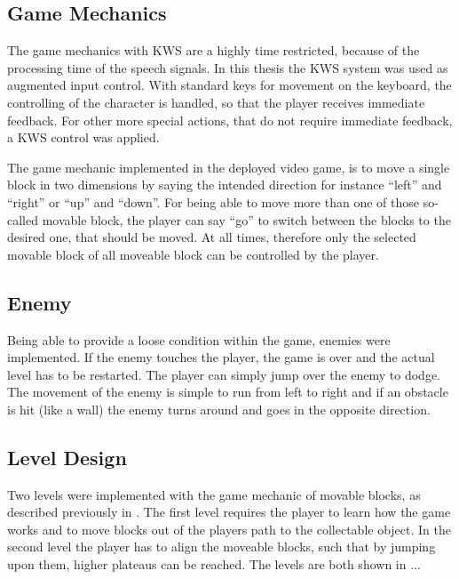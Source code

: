 
\subsection{Game Mechanics}\label{game_design_mechanics}
The game mechanics with KWS are a highly time restricted, because of the processing time of the speech signals.
In this thesis the KWS system was used as augmented input control.
With standard keys for movement on the keyboard, the controlling of the character is handled, so that the player receives immediate feedback. 
For other more special actions, that do not require immediate feedback, a KWS control was applied.

The game mechanic implemented in the deployed video game, is to move a single block in two dimensions by saying the intended direction for instance \enquote{left} and \enquote{right} or \enquote{up} and \enquote{down}.
For being able to move more than one of those so-called movable block, the player can say \enquote{go} to switch between the blocks to the desired one, that should be moved.
At all times, therefore only the selected movable block of all moveable block can be controlled by the player.



\subsection{Enemy}\label{sec:game_design_enemy}
Being able to provide a loose condition within the game, enemies were implemented.
If the enemy touches the player, the game is over and the actual level has to be restarted.
The player can simply jump over the enemy to dodge.
The movement of the enemy is simple to run from left to right and if an obstacle is hit (like a wall) the enemy turns around and goes in the opposite direction.



\subsection{Level Design}\label{sec:game_design_level}
Two levels were implemented with the game mechanic of movable blocks, as described previously in .
The first level requires the player to learn how the game works and to move blocks out of the players path to the collectable object.
In the second level the player has to align the moveable blocks, such that by jumping upon them, higher plateaus can be reached.
The levels are both shown in ...



